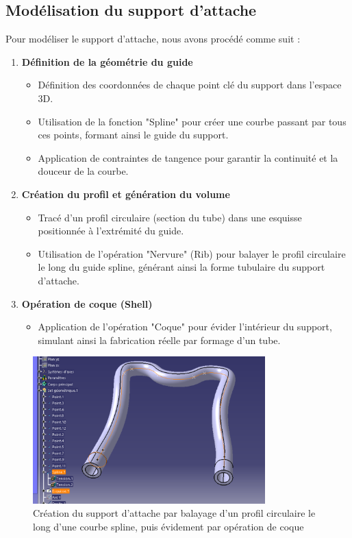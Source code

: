 \documentclass[a4paper,12pt]{report}
\begin{document}
\subsection{Modélisation du support d'attache}
Pour modéliser le support d'attache, nous avons procédé comme suit :
\begin{enumerate}
    \item \textbf{Définition de la géométrie du guide}
    \begin{itemize}
        \item Définition des coordonnées de chaque point clé du support dans l'espace 3D.
        \item Utilisation de la fonction "Spline" pour créer une courbe passant par tous ces points, formant ainsi le guide du support.
        \item Application de contraintes de tangence pour garantir la continuité et la douceur de la courbe.
    \end{itemize}
    \item \textbf{Création du profil et génération du volume}
    \begin{itemize}
        \item Tracé d'un profil circulaire (section du tube) dans une esquisse positionnée à l'extrémité du guide.
        \item Utilisation de l'opération "Nervure" (Rib) pour balayer le profil circulaire le long du guide spline, générant ainsi la forme tubulaire du support d'attache.
    \end{itemize}
    \item \textbf{Opération de coque (Shell)}
    \begin{itemize}
        \item Application de l'opération "Coque" pour évider l'intérieur du support, simulant ainsi la fabrication réelle par formage d'un tube.
    \end{itemize}
\end{enumerate}
\begin{figure}[H]
    \centering
    \includegraphics[width=0.8\textwidth]{images/support_attache_spline_nervure.png}
    \caption{Création du support d'attache par balayage d'un profil circulaire le long d'une courbe spline, puis évidement par opération de coque}
    \label{fig:support_attache_spline_nervure}
\end{figure}
\end{document}
